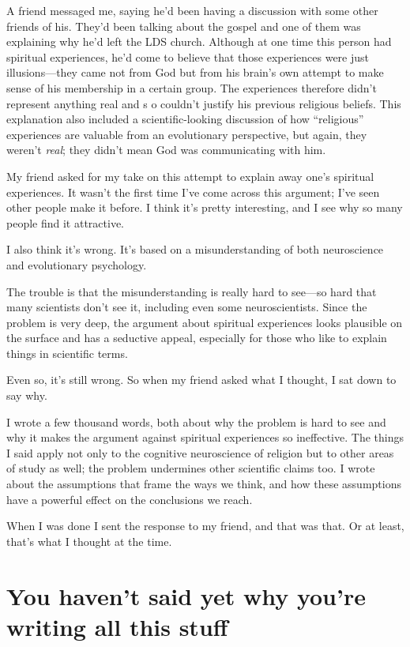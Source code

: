 A friend messaged me, saying he’d been having a discussion with some other friends of his. They’d been talking about the gospel and one of them was explaining why he’d left the LDS church. Although at one time this person had spiritual experiences, he’d come to believe that those experiences were just illusions—they came not from God but from his brain’s own attempt to make sense of his membership in a certain group. The experiences therefore didn’t represent anything real and s o couldn’t justify his previous religious beliefs. This explanation also included a scientific-looking discussion of how “religious” experiences are valuable from an evolutionary perspective, but again, they weren’t \textit{real}; they didn’t mean God was communicating with him.

My friend asked for my take on this attempt to explain away one’s spiritual experiences. It wasn’t the first time I’ve come across this argument; I’ve seen other people make it before. I think it’s pretty interesting, and I see why so many people find it attractive.

I also think it’s wrong. It’s based on a misunderstanding of both neuroscience and evolutionary psychology.

The trouble is that the misunderstanding is really hard to see—so hard that many scientists don’t see it, including even some neuroscientists. Since the problem is very deep, the argument about spiritual experiences looks plausible on the surface and has a seductive appeal, especially for those who like to explain things in scientific terms.

Even so, it’s still wrong. So when my friend asked what I thought, I sat down to say why.

I wrote a few thousand words, both about why the problem is hard to see and why it makes the argument against spiritual experiences so ineffective. The things I said apply not only to the cognitive neuroscience of religion but to other areas of study as well; the problem undermines other scientific claims too. I wrote about the assumptions that frame the ways we think, and how these assumptions have a powerful effect on the conclusions we reach.

When I was done I sent the response to my friend, and that was that. Or at least, that’s what I thought at the time.

\section{You haven’t said yet why you’re writing all this stuff}

